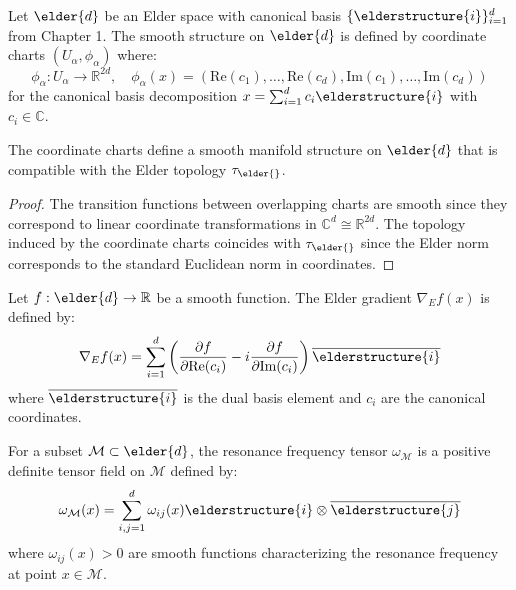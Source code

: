 \begin{definition}
Let $\elder{d}$ be an Elder space with canonical basis $\{\elderstructure{i}\}_{i=1}^d$ from Chapter 1. The smooth structure on $\elder{d}$ is defined by coordinate charts $(U_\alpha, \phi_\alpha)$ where:
\begin{equation}
\phi_\alpha: U_\alpha \rightarrow \mathbb{R}^{2d}, \quad \phi_\alpha(x) = (\text{Re}(c_1), \ldots, \text{Re}(c_d), \text{Im}(c_1), \ldots, \text{Im}(c_d))
\end{equation}
for the canonical basis decomposition $x = \sum_{i=1}^d c_i \elderstructure{i}$ with $c_i \in \mathbb{C}$.
\end{definition}

\begin{proposition}
The coordinate charts define a smooth manifold structure on $\elder{d}$ that is compatible with the Elder topology $\tau_{\elder{}}$.
\end{proposition}

\begin{proof}
The transition functions between overlapping charts are smooth since they correspond to linear coordinate transformations in $\mathbb{C}^d \cong \mathbb{R}^{2d}$. The topology induced by the coordinate charts coincides with $\tau_{\elder{}}$ since the Elder norm corresponds to the standard Euclidean norm in coordinates.
\end{proof}

\begin{definition}
Let $f: \elder{d} \rightarrow \mathbb{R}$ be a smooth function. The Elder gradient $\nabla_E f(x)$ is defined by:
\begin{equation}
\nabla_E f(x) = \sum_{i=1}^d \left(\frac{\partial f}{\partial \text{Re}(c_i)} - i \frac{\partial f}{\partial \text{Im}(c_i)}\right) \overline{\elderstructure{i}}
\end{equation}
where $\overline{\elderstructure{i}}$ is the dual basis element and $c_i$ are the canonical coordinates.
\end{definition}

\begin{definition}
For a subset $\mathcal{M} \subset \elder{d}$, the resonance frequency tensor $\omega_{\mathcal{M}}$ is a positive definite tensor field on $\mathcal{M}$ defined by:
\begin{equation}
\omega_{\mathcal{M}}(x) = \sum_{i,j=1}^d \omega_{ij}(x) \elderstructure{i} \otimes \overline{\elderstructure{j}}
\end{equation}
where $\omega_{ij}(x) > 0$ are smooth functions characterizing the resonance frequency at point $x \in \mathcal{M}$.
\end{definition}

